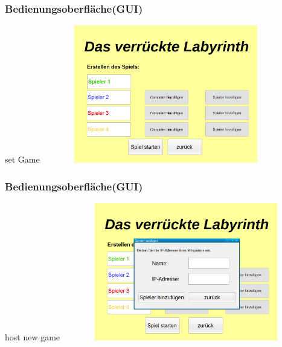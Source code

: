 \documentclass{beamer}
\begin{document}
	    \label{Frame3}	
		\begin{frame}
			\frametitle{Bedienungsoberfläche(GUI)}
			\begin{block}{set Game}
				\includegraphics[width = 10.8cm, height = 6cm]{BilderGUI/03-titelhost.png}
			\end{block}		
		\end{frame}


	    \label{Frame4}	
		\begin{frame}
			\frametitle{Bedienungsoberfläche(GUI)}
			\begin{block}{host new game}
				\includegraphics[width = 10.8cm, height = 6cm]{BilderGUI/04-titelhostnewplayer.png}
			\end{block}		
		\end{frame}
\end{document}
